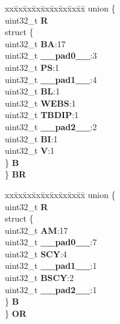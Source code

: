 \begin{DoxyCompactItemize}
\begin{tabbing}
\end{tabbing}\item 
\mbox{\label{structEBI__CS__tag_a0b257e523c77ceffa2c92dbd9b10589d}} 
\begin{tabbing}
xx\=xx\=xx\=xx\=xx\=xx\=xx\=xx\=xx\=\kill
union \{\\
\>uint32\_t {\bfseries R}\\
\>struct \{\\
\>\>uint32\_t {\bfseries BA}:17\\
\>\>uint32\_t {\bfseries \_\_pad0\_\_}:3\\
\>\>uint32\_t {\bfseries PS}:1\\
\>\>uint32\_t {\bfseries \_\_pad1\_\_}:4\\
\>\>uint32\_t {\bfseries BL}:1\\
\>\>uint32\_t {\bfseries WEBS}:1\\
\>\>uint32\_t {\bfseries TBDIP}:1\\
\>\>uint32\_t {\bfseries \_\_pad2\_\_}:2\\
\>\>uint32\_t {\bfseries BI}:1\\
\>\>uint32\_t {\bfseries V}:1\\
\>\} {\bfseries B}\\
\} {\bfseries BR}\\

\end{tabbing}\item 
\mbox{\label{structEBI__CS__tag_a48b8b3dccca6a7d2d823ec53e97fc3a7}} 
\begin{tabbing}
xx\=xx\=xx\=xx\=xx\=xx\=xx\=xx\=xx\=\kill
union \{\\
\>uint32\_t {\bfseries R}\\
\>struct \{\\
\>\>uint32\_t {\bfseries AM}:17\\
\>\>uint32\_t {\bfseries \_\_pad0\_\_}:7\\
\>\>uint32\_t {\bfseries SCY}:4\\
\>\>uint32\_t {\bfseries \_\_pad1\_\_}:1\\
\>\>uint32\_t {\bfseries BSCY}:2\\
\>\>uint32\_t {\bfseries \_\_pad2\_\_}:1\\
\>\} {\bfseries B}\\
\} {\bfseries OR}\\


\end{tabbing}
\end{DoxyCompactItemize}
